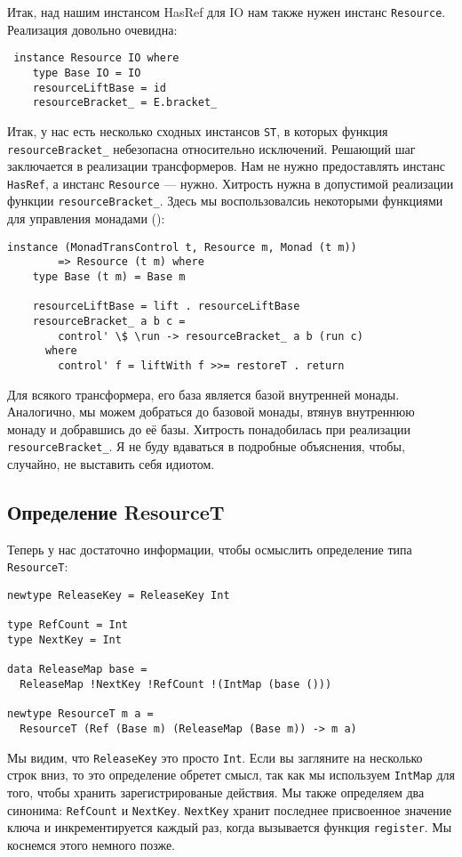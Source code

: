 Итак, над нашим инстансом HasRef для IO нам также нужен инстанс
\lstinline'Resource'. Реализация довольно очевидна:
\begin{lstlisting}
 instance Resource IO where
    type Base IO = IO
    resourceLiftBase = id
    resourceBracket_ = E.bracket_
\end{lstlisting}

Итак, у нас есть несколько сходных инстансов \lstinline'ST', в которых функция
\lstinline'resourceBracket_' небезопасна относительно исключений. Решающий шаг заключается
в реализации трансформеров. Нам не нужно
предоставлять инстанс \lstinline'HasRef', а инстанс \lstinline'Resource' --- нужно.
Хитрость нужна в допустимой реализации функции \lstinline'resourceBracket_'. Здесь мы
воспользовалсиь некоторыми функциями для управления монадами 
():

\begin{lstlisting}
instance (MonadTransControl t, Resource m, Monad (t m))
        => Resource (t m) where
    type Base (t m) = Base m

    resourceLiftBase = lift . resourceLiftBase
    resourceBracket_ a b c =
        control' \$ \run -> resourceBracket_ a b (run c)
      where
        control' f = liftWith f >>= restoreT . return 
\end{lstlisting}
Для всякого трансформера, его база является базой внутренней монады. Аналогично, мы можем
добраться до базовой монады, втянув внутреннюю монаду и добравшись до её базы. Хитрость
понадобилась при реализации \verb=resourceBracket_=. Я не буду вдаваться в подробные
объяснения, чтобы, случайно, не выставить себя идиотом. 

\subsection{Определение ResourceT}

Теперь у нас достаточно информации, чтобы осмыслить определение типа
\lstinline'ResourceT':
\begin{lstlisting}
newtype ReleaseKey = ReleaseKey Int

type RefCount = Int
type NextKey = Int

data ReleaseMap base =
  ReleaseMap !NextKey !RefCount !(IntMap (base ()))

newtype ResourceT m a =
  ResourceT (Ref (Base m) (ReleaseMap (Base m)) -> m a)
\end{lstlisting}
Мы видим, что \lstinline'ReleaseKey' это просто \lstinline'Int'. Если вы загляните на
несколько строк вниз, то
это определение обретет смысл, так как мы используем \lstinline'IntMap' для того, чтобы
хранить
зарегистрированые действия. Мы также определяем два синонима: \lstinline'RefCount' и
\lstinline'NextKey'. \lstinline'NextKey'
хранит последнее присвоенное значение ключа и инкрементируется каждый раз, когда
вызывается функция \verb=register=. Мы коснемся этого немного позже.

